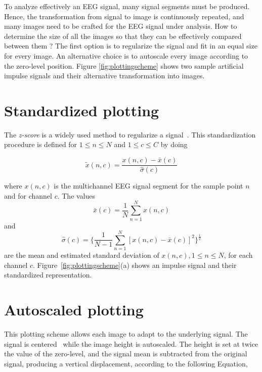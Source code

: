 To analyze effectively an EEG signal, many signal segments must be produced.  Hence, the transformation from signal to image is continuously repeated, and many images need to be crafted for the EEG signal under analysis.  How to determine the size of all the images so that they can be effectively compared between them ?  The first option is to regularize the signal and fit in an equal size for every image.  An alternative choice is to autoscale every image according to the zero-level position.  Figure \ref{fig:plottingscheme} shows two sample artificial impulse signals and their  alternative transformation into images.

\section{Standardized plotting}
\label{standardized}

The \textit{z-score} is a widely used method to regularize a signal~\cite{VandenBerg2006,Zhang2013}. This standardization procedure is defined for  $1 \leq n \leq N$ and $1 \leq c \leq C$ by doing

\begin{equation}
\tilde{x}(n,c) =  \frac{ x(n,c) - \bar{x}(c) }{ \hat{\sigma}(c) } 
\label{eq:standarizedaverages}
\end{equation}

\noindent  where $ x(n,c) $ is the multichannel EEG signal segment for the sample point $n$ and for channel $c$. The values $$\bar{x}(c) =\frac{1}{N}\sum_{n=1}^{N}x(n,c)$$ and $$ \hat{\sigma}(c) =   \bigg \{ \frac{1}{N-1}\sum_{n=1}^{N} { \left[ x(n,c)-\bar{x}(c) \right]  }^2 \bigg \}^{\frac{1}{2}}$$ are the mean and estimated standard deviation of $x(n,c), 1 \leq n \leq N$, for each channel $c$. Figure~\ref{fig:plottingscheme}(a) shows an impulse signal and their standardized representation.

\section{Autoscaled plotting}
\label{autoscaled}

This plotting scheme allows each image to adapt to the underlying signal.  The signal is centered~\cite{VandenBerg2006} while the image height is autoscaled. The height is set at twice the value of the zero-level, and the signal mean is subtracted from the original signal, producing a vertical displacement, according to the following Equation,

